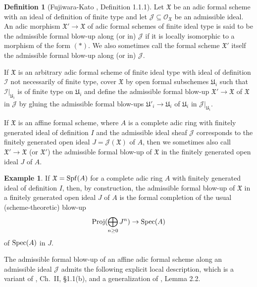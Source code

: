 \documentclass[12pt,twoside,a4paper]{article}
\theoremstyle{definition}
\newtheorem{mydef}[thm]{Definition}
\newtheorem{example}[thm]{Example}
\theoremstyle{remark}
\newcommand\Proj{{\rm Proj}}
\newcommand\Spec{{\rm Spec}}
\newcommand\Spf{{\rm Spf}}
\begin{document}
\begin{mydef}[Fujiwara-Kato \cite{FK}, Definition 1.1.1]\label{Admissible formal blow-up}Let $\mathfrak{X}$ be an adic formal scheme with an ideal of definition of finite type and let $\mathcal{J}\subseteq \mathcal{O}_{\mathfrak{X}}$ be an admissible ideal. An adic morphism $\mathfrak{X}'\to \mathfrak{X}$ of adic formal schemes of finite ideal type is said to be the admissible formal blow-up along (or in) $\mathcal{J}$ if it is locally isomorphic to a morphism of the form $(\ast)$. We also sometimes call the formal scheme $\mathfrak{X}'$ itself the admissible formal blow-up along (or in) $\mathcal{J}$. 

If $\mathfrak{X}$ is an arbitrary adic formal scheme of finite ideal type with ideal of definition $\mathcal{I}$ not necessarily of finite type, cover $\mathfrak{X}$ by open formal subschemes $\mathfrak{U}_{i}$ such that $\mathcal{I}\vert_{\mathfrak{U}_{i}}$ is of finite type on $\mathfrak{U}_{i}$ and define the admissible formal blow-up $\mathfrak{X}'\to\mathfrak{X}$ of $\mathfrak{X}$ in $\mathcal{J}$ by gluing the admissible formal blow-ups $\mathfrak{U}'_{i}\to \mathfrak{U}_{i}$ of $\mathfrak{U}_{i}$ in $\mathcal{J}\vert_{\mathfrak{U}_{i}}$.

If $\mathfrak{X}$ is an affine formal scheme, where $A$ is a complete adic ring with finitely generated ideal of definition $I$ and the admissible ideal sheaf $\mathcal{J}$ corresponds to the finitely generated open ideal $J=\mathcal{J}(\mathfrak{X})$ of $A$, then we sometimes also call $\mathfrak{X}'\to \mathfrak{X}$ (or $\mathfrak{X}'$) the admissible formal blow-up of $\mathfrak{X}$ in the finitely generated open ideal $J$ of $A$. \end{mydef}
\begin{example}\label{Admissible formal blow-up in the affine case}If $\mathfrak{X}=\Spf(A)$ for a complete adic ring $A$ with finitely generated ideal of definition $I$, then, by construction, the admissible formal blow-up of $\mathfrak{X}$ in a finitely generated open ideal $J$ of $A$ is the formal completion of the usual (scheme-theoretic) blow-up \begin{equation*}\Proj(\bigoplus_{n\geq0}J^{n})\to \Spec(A)\end{equation*}of $\Spec(A)$ in $J$.\end{example}
The admissible formal blow-up of an affine adic formal scheme along an admissible ideal $\mathcal{J}$ admits the following explicit local description, which is a variant of \cite{FK}, Ch.~II, \S1.1(b), and a generalization of \cite{BL1}, Lemma 2.2.
\end{document}
